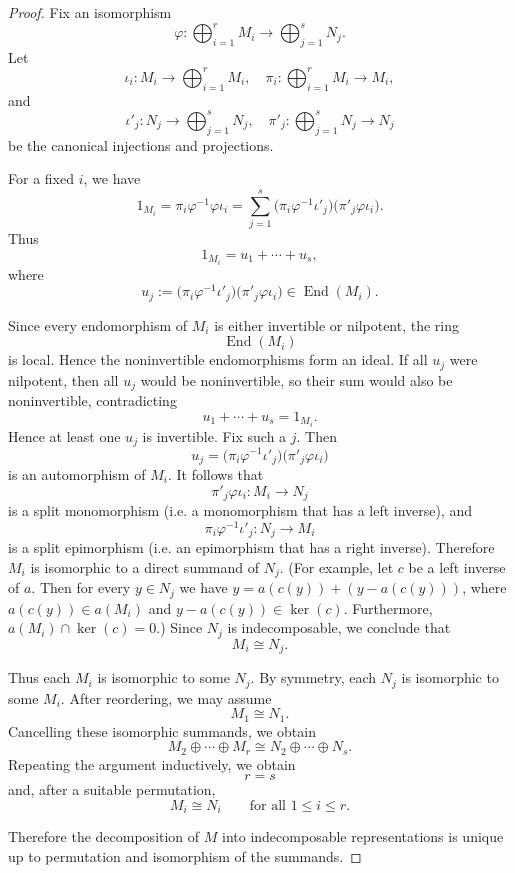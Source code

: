 \documentclass[11pt, a4paper]{report}
\begin{document}
\begin{proof}
    Fix an isomorphism
    \[
        \varphi:\bigoplus_{i=1}^r M_i \longrightarrow \bigoplus_{j=1}^s N_j.
    \]
    Let
    \[
        \iota_i:M_i\to \bigoplus_{i=1}^r M_i,
        \quad
        \pi_i:\bigoplus_{i=1}^r M_i\to M_i,
    \]
    and
    \[
        \iota'_j:N_j\to \bigoplus_{j=1}^s N_j,
        \quad
        \pi'_j:\bigoplus_{j=1}^s N_j\to N_j
    \]
    be the canonical injections and projections.

    For a fixed \(i\), we have
    \[
        1_{M_i}
        =
        \pi_i \varphi^{-1}\varphi \iota_i
        =
        \sum_{j=1}^s
        \bigl(\pi_i\varphi^{-1}\iota'_j\bigr)\bigl(\pi'_j\varphi\iota_i\bigr).
    \]
    Thus
    \[
        1_{M_i}=u_1+\cdots+u_s,
    \]
    where
    \[
        u_j:=
        \bigl(\pi_i\varphi^{-1}\iota'_j\bigr)\bigl(\pi'_j\varphi\iota_i\bigr)
        \in \operatorname{End}(M_i).
    \]

    Since every endomorphism of \(M_i\) is either invertible or nilpotent, the ring
    \[
\operatorname{End}(M_i)
\]
is local. Hence the noninvertible endomorphisms form an ideal.
If all \(u_j\) were nilpotent, then all \(u_j\) would be noninvertible, so their sum
would also be noninvertible, contradicting
\[
u_1+\cdots+u_s=1_{M_i}.
\]Hence at least one \(u_j\) is invertible. Fix such a \(j\). Then
    \[
        u_j=
        \bigl(\pi_i\varphi^{-1}\iota'_j\bigr)\bigl(\pi'_j\varphi\iota_i\bigr)
    \]
    is an automorphism of \(M_i\). It follows that
    \[
        \pi'_j\varphi\iota_i : M_i \to N_j
    \]
    is a split monomorphism (i.e. a monomorphism that has a left inverse), and
    \[
        \pi_i\varphi^{-1}\iota'_j : N_j \to M_i
    \]
    is a split epimorphism (i.e. an epimorphism that has a right inverse). Therefore \(M_i\) is isomorphic to a direct summand of \(N_j\). (For example, let $c$ be a left inverse of $a$. Then for every $y \in N_j$ we have $y=a(c(y))+(y-a(c(y)))$, where $a(c(y)) \in a(M_i)$ and $y-a(c(y)) \in \operatorname{ker}(c)$. Furthermore, $a(M_i) \cap \operatorname{ker}(c) = 0$.) Since \(N_j\) is indecomposable, we conclude that
    \[
        M_i \cong N_j.
    \]

    Thus each \(M_i\) is isomorphic to some \(N_j\). By symmetry, each \(N_j\) is isomorphic to some \(M_i\). After reordering, we may assume
    \[
        M_1 \cong N_1.
    \]
    Cancelling these isomorphic summands, we obtain
    \[
        M_2\oplus \cdots \oplus M_r
        \cong
        N_2\oplus \cdots \oplus N_s.
    \]
    Repeating the argument inductively, we obtain
    \[
        r=s
    \]
    and, after a suitable permutation,
    \[
        M_i \cong N_i
        \qquad \text{for all } 1\le i\le r.
    \]

    Therefore the decomposition of \(M\) into indecomposable representations is unique up to permutation and isomorphism of the summands.
\end{proof}
\end{document}

